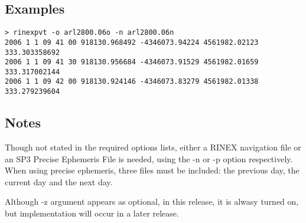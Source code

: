 \subsection{Examples}
\begin{\outputsize}
\begin{verbatim}
> rinexpvt -o arl2800.06o -n arl2800.06n
2006 1 1 09 41 00 918130.968492 -4346073.94224 4561982.02123 333.303358692
2006 1 1 09 41 30 918130.956684 -4346073.91529 4561982.01659 333.317002144
2006 1 1 09 42 00 918130.924146 -4346073.83279 4561982.01338 333.279239604
\end{verbatim}
\end{\outputsize}
\subsection{Notes}
Though not stated in the required options lists, either a RINEX navigation file or an SP3 Precise Ephemeris File is needed, using the -n or -p option respectively. When using precise ephemeris, three files must be included: the previous day, the current day and the next day. 

Although -z argument appears as optional, in this release, it is alwasy turned on, but implementation will occur in a later release.
%


